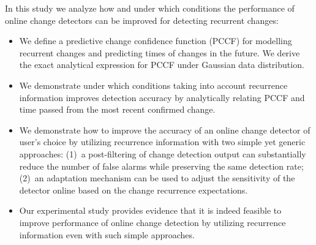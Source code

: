 In this study we analyze how and under which conditions the performance of online change detectors can be improved for detecting recurrent changes:
\begin{itemize}	\setlength\itemsep{0pt}
    \item We define a predictive change confidence function (PCCF) for modelling recurrent changes and predicting times of changes in the future. We derive the exact analytical expression for PCCF under Gaussian data distribution.
    \item We demonstrate under which conditions taking into account recurrence information improves detection accuracy by analytically relating PCCF and time passed from the most recent confirmed change.

    \item We demonstrate how to improve the accuracy of an online change detector of user's choice by utilizing recurrence information with two simple yet generic approaches: (1)~a post-filtering of change detection output can substantially reduce the number of false alarms while preserving the same detection rate; (2)~an adaptation mechanism can be used to adjust the sensitivity of the detector online based on the change recurrence expectations.

    \item Our experimental study provides evidence that it is indeed feasible to improve performance of online change detection by utilizing recurrence information even with such simple approaches.
\end{itemize}

